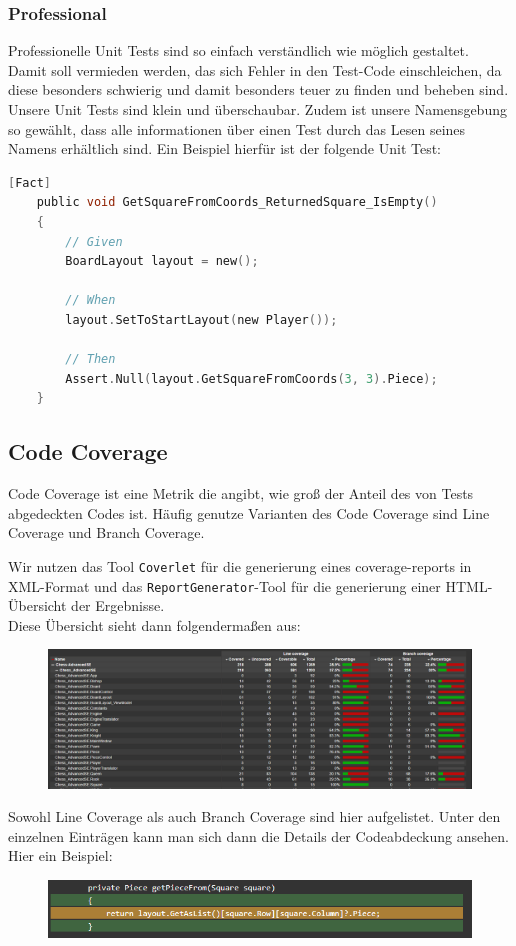\documentclass[
10pt, %
a4paper, %
oneside, %
headinclude,footinclude, %
BCOR5mm, %
]{scrartcl}
\begin{document}
\begin{onehalfspace}
\subsubsection{Professional}
Professionelle Unit Tests sind so einfach verständlich wie möglich gestaltet. Damit soll vermieden werden, das sich Fehler in den Test-Code einschleichen, da diese besonders schwierig und damit besonders teuer zu finden und beheben sind.
Unsere Unit Tests sind klein und überschaubar. Zudem ist unsere Namensgebung so gewählt, dass alle informationen über einen Test durch das Lesen seines Namens erhältlich sind. Ein Beispiel hierfür ist der folgende Unit Test:
\begin{lstlisting}[language=c, style=mStyle]
	[Fact]
	public void GetSquareFromCoords_ReturnedSquare_IsEmpty()
	{
		// Given
		BoardLayout layout = new();

		// When
		layout.SetToStartLayout(new Player());
		
		// Then
		Assert.Null(layout.GetSquareFromCoords(3, 3).Piece);
	}
\end{lstlisting}

\subsection{Code Coverage}
Code Coverage ist eine Metrik die angibt, wie 
groß der Anteil des von Tests abgedeckten Codes ist. Häufig genutze Varianten des Code Coverage sind Line Coverage und Branch Coverage.

Wir nutzen das Tool \texttt{Coverlet} für die generierung eines coverage-reports in XML-Format und das \texttt{ReportGenerator}-Tool für die generierung einer HTML-Übersicht der Ergebnisse.
\\
Diese Übersicht sieht dann folgendermaßen aus:
\begin{figure}[ht!]
	\includegraphics[width=\linewidth]{coveragereport}
\end{figure}

Sowohl Line Coverage als auch Branch Coverage sind hier aufgelistet. Unter den einzelnen Einträgen kann man sich dann die Details der Codeabdeckung ansehen.
Hier ein Beispiel:
\begin{figure}[ht!]
	\includegraphics[width=\linewidth]{methodcovered}
\end{figure}


\end{onehalfspace}
\end{document}
